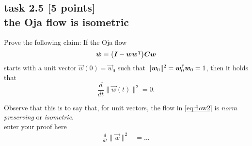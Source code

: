 
\subsection*{task 2.5 [5 points] \\[1ex] the Oja flow is isometric}

Prove the following claim: If the Oja flow 
\begin{equation}
\label{eq:flow2}
\dot{\bm{w}} = \bigl( \bm{I} - \bm{w} \bm{w}^\intercal \bigr) \bm{C} \bm{w}
\end{equation} 
starts with a unit vector $\vec{w}(0) = \vec{w}_0$ such that $\lVert \bm{w}_0 \rVert^2 = \bm{w}_0^\intercal{\bm{w}_0} = 1$, then it holds that
\begin{equation*}
\frac{d}{dt} \lVert \vec{w}(t) \rVert^2 = 0.
\end{equation*}

Observe that this is to say that, for unit vectors, the flow in \eqref{eq:flow2} is \emph{norm preserving} or \emph{isometric}.
\color{blue} \\[1ex]
enter your proof here 
\begin{align*}
\frac{d}{dt} \lVert \vec{w} \rVert^2
& = \ldots
\end{align*}
\color{black}





